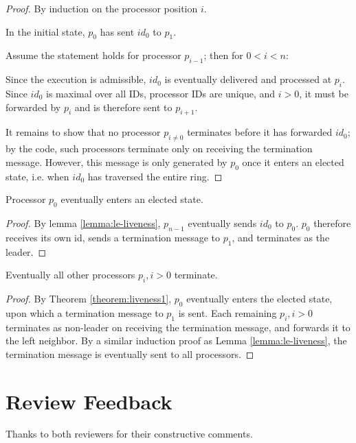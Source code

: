 \begin{proof}
By induction on the processor position $i$.

In the initial state, $p_0$ has sent $id_0$ to $p_1$.

Assume the statement holds
for processor $p_{i-1}$; then for $0 < i < n$:

Since the execution is admissible, $id_0$ is eventually
delivered and processed at $p_{i}$. Since $id_0$ is maximal over all IDs, processor IDs
are unique, and $i > 0$, it must be forwarded by $p_i$ and is therefore sent to $p_{i+1}$.

It remains to show that no processor $p_{i \neq 0}$ terminates before it has 
forwarded $id_0$; by the code, such processors terminate only on receiving
the termination message. However, this message is only generated by $p_0$
once it enters an elected state, i.e. when $id_0$ has traversed the entire ring.
\end{proof}

\begin{theorem} \label{theorem:liveness1}
Processor $p_0$ eventually enters an elected state.
\end{theorem}

\begin{proof}
By lemma \ref{lemma:le-liveness}, $p_{n-1}$ eventually sends $id_0$ to $p_0$.
$p_0$ therefore receives its own id, sends a termination message to $p_1$,
and terminates as the leader.
\end{proof}

\begin{theorem}
Eventually all other processors $p_i, i > 0$ terminate.
\end{theorem}

\begin{proof}
By Theorem \ref{theorem:liveness1}, $p_0$ eventually enters the elected state,
upon which a termination message to $p_1$ is sent. Each remaining $p_i, i > 0$ terminates
as non-leader on receiving the termination message, and forwards it to the left neighbor.
By a similar induction proof as Lemma \ref{lemma:le-liveness}, the termination message
is eventually sent to all processors.
\end{proof}

\section{Review Feedback}

Thanks to both reviewers for their constructive comments.

